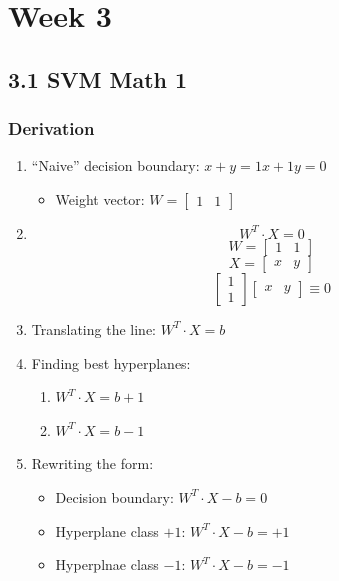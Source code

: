 \documentclass{article}
\begin{document}
\section*{Week 3}

\subsection*{3.1 SVM Math 1}
\subsubsection*{Derivation}
\begin{enumerate}
    \item ``Naive'' decision boundary: $x + y = 1x + 1y = 0$
    \begin{itemize}
        \item Weight vector: $W = \begin{bmatrix} 1 & 1 \end{bmatrix}$
    \end{itemize}
    \item \[W^T \cdot X = 0\] \[W = \begin{bmatrix} 1 & 1 \end{bmatrix}\] \[X = \begin{bmatrix} x & y \end{bmatrix}\] \[\begin{bmatrix} 1 \\ 1 \end{bmatrix} \begin{bmatrix} x & y \end{bmatrix} \equiv 0\]
    \item Translating the line: $W^T \cdot X = b$
    \item Finding best hyperplanes:
    \begin{enumerate}
        \item $W^T \cdot X = b + 1$
        \item $W^T \cdot X = b - 1$
    \end{enumerate}
    \item Rewriting the form:
    \begin{itemize}
        \item Decision boundary: $W^T \cdot X - b = 0$
        \item Hyperplane class $+1$: $W^T \cdot X - b = +1$
        \item Hyperplnae class $-1$: $W^T \cdot X - b = -1$

\end{itemize}
\end{enumerate}
\end{document}
